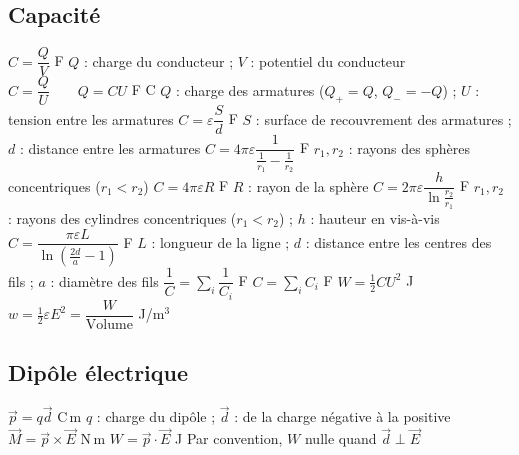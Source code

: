\subsection{Capacité}
\begin{formules}
    {$C = \dfrac{Q}{V}$}
    {F}
    {$Q$ : charge du conducteur ; $V$ : potentiel du conducteur}
    {$C = \dfrac{Q}{U} \qquad Q = CU$}
    {F \newline C}
    {$Q$ : charge des armatures ($Q_+ = Q$, $Q_- = -Q$) ; $U$ : tension entre les armatures}
    {$C = \varepsilon\dfrac{S}{d}$}
    {F}
    {$S$ : surface de recouvrement des armatures ; $d$ : distance entre les armatures}
    {$C = 4\pi\varepsilon\dfrac{1}{\frac{1}{r_1} - \frac{1}{r_2}}$}
    {F}
    {$r_1, r_2$ : rayons des sphères concentriques ($r_1 < r_2$)}
    {$C = 4\pi\varepsilon R$}
    {F}
    {$R$ : rayon de la sphère}
    {$C = 2\pi\varepsilon\dfrac{h}{\ln\frac{r_2}{r_1}}$}
    {F}
    {$r_1, r_2$ : rayons des cylindres concentriques ($r_1 < r_2$) ; $h$ : hauteur en vis-à-vis}
    {$C = \dfrac{\pi\varepsilon L}{\ln\left(\frac{2d}{a} - 1\right)}$}
    {F}
    {$L$ : longueur de la ligne ; $d$ : distance entre les centres des fils ; $a$ : diamètre des fils}
    {$\dfrac{1}{C} = \sum\limits_i \dfrac{1}{C_i}$}
    {F}
    {}
    {$C = \sum\limits_i C_i$}
    {F}
    {}
    {$W = \frac{1}{2}CU^2$}
    {J}
    {}
    {$w = \frac{1}{2}\varepsilon E^2 = \dfrac{W}{\text{Volume}}$}
    {J/m$^3$}
    {}
\end{formules}

\subsection{Dipôle électrique}
\begin{formules}
    {$\vec p = q\vec d$}
    {C\,m}
    {
     $q$ : charge du dipôle ; $\vec d$ : de la charge négative à la positive}
    {$\vec M = \vec p\times\vec E$}
    {N\,m}
    {}
    {$W = \vec p\cdot\vec E$}
    {J}
    {Par convention, $W$ nulle quand $\vec d\perp\vec E$}
\end{formules}

